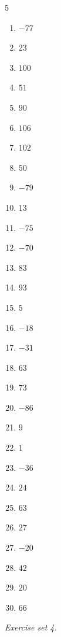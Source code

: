 \begin{multicols}{5}\raggedright
\begin{enumerate}[label=\arabic*., leftmargin=*, itemsep=1pt]
\item $-77$
\item $23$
\item $100$
\item $51$
\item $90$
\item $106$
\item $102$
\item $50$
\item $-79$
\item $13$
\item $-75$
\item $-70$
\item $83$
\item $93$
\item $5$
\item $-18$
\item $-31$
\item $63$
\item $73$
\item $-86$
\item $9$
\item $1$
\item $-36$
\item $24$
\item $63$
\item $27$
\item $-20$
\item $42$
\item $20$
\item $66$
\end{enumerate}
\end{multicols}
\par\noindent\emph{Exercise set 4.}\nopagebreak
